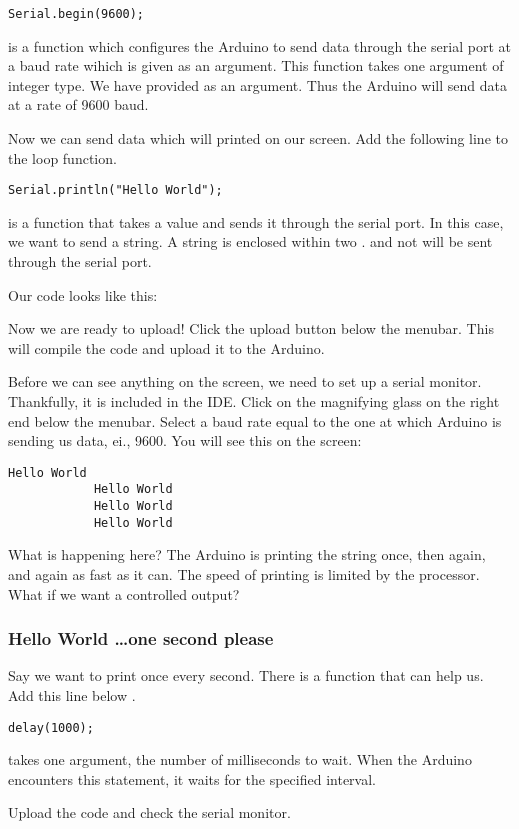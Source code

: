\documentclass{article}
\begin{document}
			\begin{lstlisting}[firstnumber = 3]
			Serial.begin(9600);
			\end{lstlisting}

			 is a function which configures the Arduino to send data through the serial port at a baud rate wihich is given as an argument. This function takes one argument of integer type. We have provided  as an argument. Thus the Arduino will send data at a rate of 9600 baud.

			Now we can send data which will printed on our screen. Add the following line to the loop function.

			\begin{lstlisting}[firstnumber = 8]
			Serial.println("Hello World");
			\end{lstlisting}

			 is a function that takes a value and sends it through the serial port. In this case, we want to send a string. A string is enclosed within two .  and not  will be sent through the serial port.

			Our code looks like this:

			

			Now we are ready to upload! Click the upload button below the menubar. This will compile the code and upload it to the Arduino.

			Before we can see anything on the screen, we need to set up a serial monitor. Thankfully, it is included in the IDE. Click on the magnifying glass on the right end below the menubar. Select a baud rate equal to the one at which Arduino is sending us data, ei., 9600. You will see this on the screen:

			\begin{lstlisting}[firstnumber = 1738]
			Hello World
			Hello World
			Hello World
			Hello World
			\end{lstlisting}

			What is happening here? The Arduino is printing the string once, then again, and again as fast as it can. The speed of printing is limited by the processor. What if we want a controlled output?

		\subsubsection{Hello World \ldots one second please}

			Say we want to print  once every second. There is a function  that can help us. Add this line below .

			\begin{lstlisting}[firstnumber = 9]
			delay(1000);
			\end{lstlisting}

			 takes one argument, the number of milliseconds to wait. When the Arduino encounters this statement, it waits for the specified interval. 

			Upload the code and check the serial monitor.
\end{document}
